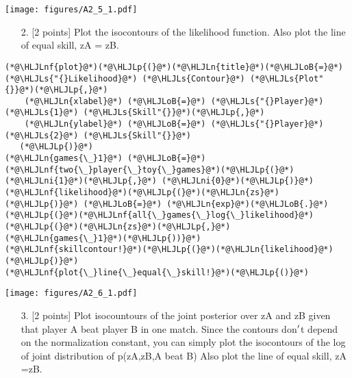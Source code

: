 \documentclass[12pt,a4paper]{article}
\newcommand{\HLJLn}[1]{#1}
\newcommand{\HLJLnf}[1]{\textcolor[RGB]{66,102,213}{#1}}
\newcommand{\HLJLs}[1]{\textcolor[RGB]{201,61,57}{#1}}
\newcommand{\HLJLni}[1]{\textcolor[RGB]{59,151,46}{#1}}
\newcommand{\HLJLoB}[1]{\textcolor[RGB]{102,102,102}{\textbf{#1}}}
\newcommand{\HLJLp}[1]{#1}
\begin{document}
\texttt{[image: figures/A2\_5\_1.pdf]}

\begin{itemize}
\item[2. ] [2 points] Plot the isocontours of the likelihood function. Also plot the line of equal skill, zA = zB.

\end{itemize}

\begin{lstlisting}
(*@\HLJLnf{plot}@*)(*@\HLJLp{(}@*)(*@\HLJLn{title}@*)(*@\HLJLoB{=}@*)(*@\HLJLs{"{}Likelihood}@*) (*@\HLJLs{Contour}@*) (*@\HLJLs{Plot"{}}@*)(*@\HLJLp{,}@*)
    (*@\HLJLn{xlabel}@*) (*@\HLJLoB{=}@*) (*@\HLJLs{"{}Player}@*) (*@\HLJLs{1}@*) (*@\HLJLs{Skill"{}}@*)(*@\HLJLp{,}@*)
    (*@\HLJLn{ylabel}@*) (*@\HLJLoB{=}@*) (*@\HLJLs{"{}Player}@*) (*@\HLJLs{2}@*) (*@\HLJLs{Skill"{}}@*)
   (*@\HLJLp{)}@*)
(*@\HLJLn{games{\_}1}@*) (*@\HLJLoB{=}@*) (*@\HLJLnf{two{\_}player{\_}toy{\_}games}@*)(*@\HLJLp{(}@*)(*@\HLJLni{1}@*)(*@\HLJLp{,}@*) (*@\HLJLni{0}@*)(*@\HLJLp{)}@*)
(*@\HLJLnf{likelihood}@*)(*@\HLJLp{(}@*)(*@\HLJLn{zs}@*)(*@\HLJLp{)}@*) (*@\HLJLoB{=}@*) (*@\HLJLn{exp}@*)(*@\HLJLoB{.}@*)(*@\HLJLp{(}@*)(*@\HLJLnf{all{\_}games{\_}log{\_}likelihood}@*)(*@\HLJLp{(}@*)(*@\HLJLn{zs}@*)(*@\HLJLp{,}@*) (*@\HLJLn{games{\_}1}@*)(*@\HLJLp{))}@*)
(*@\HLJLnf{skillcontour!}@*)(*@\HLJLp{(}@*)(*@\HLJLn{likelihood}@*)(*@\HLJLp{)}@*)
(*@\HLJLnf{plot{\_}line{\_}equal{\_}skill!}@*)(*@\HLJLp{()}@*)
\end{lstlisting}

\texttt{[image: figures/A2\_6\_1.pdf]}

\begin{itemize}
\item[3. ] [2 points] Plot isocountours of the joint posterior over zA and zB given that player A beat player B in one match. Since the contours don\ensuremath{\rq}t depend on the normalization constant, you can simply plot the isocontours of the log of joint distribution of p(zA,zB,A beat B) Also plot the line of equal skill, zA =zB.

\end{itemize}
\end{document}
